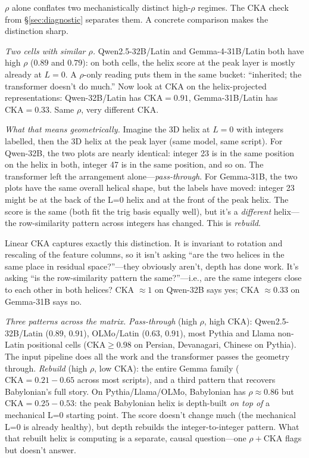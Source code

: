 \documentclass[10pt,letterpaper]{article}
\begin{document}
$\rho$ alone conflates two mechanistically distinct high-$\rho$
regimes. The CKA check from \S\ref{sec:diagnostic} separates them.
A concrete comparison makes the distinction sharp.

\emph{Two cells with similar $\rho$.} Qwen2.5-32B/Latin and
Gemma-4-31B/Latin both have high $\rho$ ($0.89$ and $0.79$):
on both cells, the helix score at the peak layer is mostly already
at $L=0$. A $\rho$-only reading puts them in the same bucket:
``inherited; the transformer doesn't do much.'' Now look at CKA on
the helix-projected representations: Qwen-32B/Latin has $\text{CKA}
= 0.91$, Gemma-31B/Latin has $\text{CKA} = 0.33$. Same $\rho$, very
different CKA.

\emph{What that means geometrically.} Imagine the 3D helix at $L=0$
with integers labelled, then the 3D helix at the peak layer (same
model, same script). For Qwen-32B, the two plots are nearly
identical: integer 23 is in the same position on the helix in both,
integer 47 is in the same position, and so on. The transformer left
the arrangement alone---\emph{pass-through}. For Gemma-31B, the two
plots have the same overall helical shape, but the labels have
moved: integer 23 might be at the back of the L=0 helix and at the
front of the peak helix. The score is the same (both fit the trig
basis equally well), but it's a \emph{different} helix---the
row-similarity pattern across integers has changed. This is
\emph{rebuild}.

Linear CKA captures exactly this distinction. It is invariant to
rotation and rescaling of the feature columns, so it isn't asking
``are the two helices in the same place in residual space?''---they
obviously aren't, depth has done work. It's asking ``is the
row-similarity pattern the same?''---i.e., are the same integers
close to each other in both helices? CKA $\approx 1$ on Qwen-32B
says yes; CKA $\approx 0.33$ on Gemma-31B says no.

\emph{Three patterns across the matrix.}
\emph{Pass-through} (high $\rho$, high CKA): Qwen2.5-32B/Latin
($0.89$, $0.91$), OLMo/Latin ($0.63$, $0.91$), most Pythia and
Llama non-Latin positional cells ($\text{CKA} \ge 0.98$ on Persian,
Devanagari, Chinese on Pythia). The input pipeline does all the
work and the transformer passes the geometry through.
\emph{Rebuild} (high $\rho$, low CKA): the entire Gemma family
($\text{CKA} = 0.21{-}0.65$ across most scripts), and a third
pattern that recovers Babylonian's full story. On
Pythia/Llama/OLMo, Babylonian has $\rho \approx 0.86$ but
$\text{CKA} = 0.25{-}0.53$: the peak Babylonian helix is depth-built
\emph{on top of} a mechanical L=0 starting point. The score doesn't
change much (the mechanical L=0 is already healthy), but depth
rebuilds the integer-to-integer pattern. What that rebuilt helix is
computing is a separate, causal question---one $\rho + \text{CKA}$
flags but doesn't answer.
\end{document}
